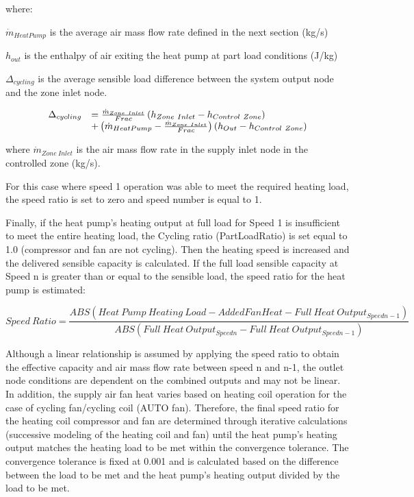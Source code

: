 where:

\({\dot m_{HeatPump}}\) is the average air mass flow rate defined in the next section (kg/s)

\(h_{out}\) is the enthalpy of air exiting the heat pump at part load conditions (J/kg)

\(\Delta_{cycling}\) is the average sensible load difference between the system output node and the zone inlet node.

\begin{equation}
  \begin{array}{rl}
    \Delta_{cycling} &= \frac{\dot{m}_{Zone~Inlet}}{Frac} \left(h_{Zone~Inlet} - h_{Control~Zone}\right) \\
                           &+ \left(\dot{m}_{HeatPump} - \frac{\dot{m}_{Zone~Inlet}}{Frac}\right) \left(h_{Out} - h_{Control~Zone}\right)
  \end{array}
\end{equation}

where \({{{\dot m}_{Zone~Inlet}}}\) is the air mass flow rate in the supply inlet node in the controlled zone (kg/s).

For this case where speed 1 operation was able to meet the required heating load, the speed ratio is set to zero and speed number is equal to 1.

Finally, if the heat pump's heating output at full load for Speed 1 is insufficient to meet the entire heating load, the Cycling ratio (PartLoadRatio) is set equal to 1.0 (compressor and fan are not cycling). Then the heating speed is increased and the delivered sensible capacity is calculated. If the full load sensible capacity at Speed n is greater than or equal to the sensible load, the speed ratio for the heat pump is estimated:

\begin{equation}
Speed~Ratio = \frac{{ABS(Heat~Pump~Heating~Load - AddedFanHeat - Full~Heat~Outpu{t_{Speedn-1}})}}{{ABS(Full~Heat~Outpu{t_{Speedn}} - Full~Heat~Outpu{t_{Speedn-1}})}}
\end{equation}

Although a linear relationship is assumed by applying the speed ratio to obtain the effective capacity and air mass flow rate between speed n and n-1, the outlet node conditions are dependent on the combined outputs and may not be linear. In addition, the supply air fan heat varies based on heating coil operation for the case of cycling fan/cycling coil (AUTO fan). Therefore, the final speed ratio for the heating coil compressor and fan are determined through iterative calculations (successive modeling of the heating coil and fan) until the heat pump's heating output matches the heating load to be met within the convergence tolerance. The convergence tolerance is fixed at 0.001 and is calculated based on the difference between the load to be met and the heat pump's heating output divided by the load to be met.

